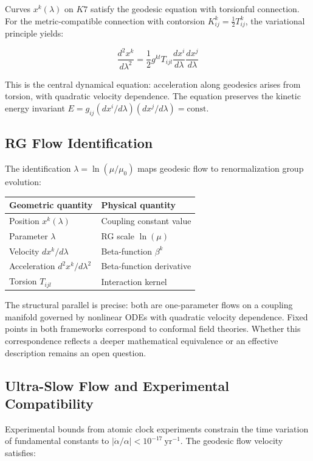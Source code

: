 \documentclass[11pt,a4paper]{article}
\newcommand{\Kseven}{K_7}
\def\Kseven{K7}%
\begin{document}
Curves $x^k(\lambda)$ on $\Kseven$ satisfy the geodesic equation with torsionful connection. For the metric-compatible connection with contorsion $K^k_{ij} = \frac{1}{2}T^k_{ij}$, the variational principle yields:

\[\boxed{\frac{d^2 x^k}{d\lambda^2} = \frac{1}{2} g^{kl} T_{ijl} \frac{dx^i}{d\lambda} \frac{dx^j}{d\lambda}}\]

This is the central dynamical equation: acceleration along geodesics arises from torsion, with quadratic velocity dependence. The equation preserves the kinetic energy invariant $E = g_{ij}(dx^i/d\lambda)(dx^j/d\lambda) = \mathrm{const}$.

\subsection{RG Flow Identification}

The identification $\lambda = \ln(\mu/\mu_0)$ maps geodesic flow to renormalization group evolution:

\begin{table}[H]
\centering
\begin{tabular}{ll}
\toprule
Geometric quantity & Physical quantity \\
\midrule
Position $x^k(\lambda)$ & Coupling constant value \\
Parameter $\lambda$ & RG scale $\ln(\mu)$ \\
Velocity $dx^k/d\lambda$ & Beta-function $\beta^k$ \\
Acceleration $d^2x^k/d\lambda^2$ & Beta-function derivative \\
Torsion $T_{ijl}$ & Interaction kernel \\
\bottomrule
\end{tabular}
\end{table}

The structural parallel is precise: both are one-parameter flows on a coupling manifold governed by nonlinear ODEs with quadratic velocity dependence. Fixed points in both frameworks correspond to conformal field theories. Whether this correspondence reflects a deeper mathematical equivalence or an effective description remains an open question.

\subsection{Ultra-Slow Flow and Experimental Compatibility}

Experimental bounds from atomic clock experiments constrain the time variation of fundamental constants to $|\dot{\alpha}/\alpha| < 10^{-17}\ \mathrm{yr}^{-1}$. The geodesic flow velocity satisfies:
\end{document}
